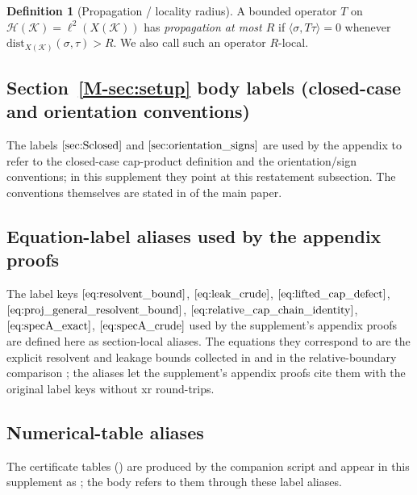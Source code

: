 \documentclass[11pt]{article}
\numberwithin{equation}{section}
\theoremstyle{definition}
\newtheorem{definition}[theorem]{Definition}
\theoremstyle{remark}
\newcommand{\K}{\mathcal{K}}
\newcommand{\Hil}{\mathcal{H}}
\newcommand{\dist}{\mathrm{dist}}
\begin{document}
\begin{definition}[Propagation / locality radius]\label{def:propagation}
A bounded operator $T$ on $\Hil(\K)=\ell^2(X(\K))$ has \emph{propagation at most $R$} if
$\langle \sigma,T\tau\rangle=0$ whenever $\dist_{X(\K)}(\sigma,\tau)>R$. We also call such an
operator $R$-local.
\end{definition}

\subsection*{Section~\protect\ref{M-sec:setup} body labels (closed-case and orientation conventions)}\label{sec:Sclosed}\label{sec:orientation_signs}

The labels \(\ref{sec:Sclosed}\) and \(\ref{sec:orientation_signs}\) are used by the appendix to
refer to the closed-case cap-product definition and the orientation/sign conventions; in this
supplement they point at this restatement subsection. The conventions themselves are stated in
 of the main paper.

\subsection*{Equation-label aliases used by the appendix proofs}
\label{eq:resolvent_bound}%
\label{eq:leak_crude}%
\label{eq:lifted_cap_defect}%
\label{eq:proj_general_resolvent_bound}%
\label{eq:relative_cap_chain_identity}%
\label{eq:specA_exact}%
\label{eq:specA_crude}%

The label keys
\(\ref{eq:resolvent_bound}\), \(\ref{eq:leak_crude}\), \(\ref{eq:lifted_cap_defect}\),
\(\ref{eq:proj_general_resolvent_bound}\), \(\ref{eq:relative_cap_chain_identity}\),
\(\ref{eq:specA_exact}\), \(\ref{eq:specA_crude}\) used by the supplement's appendix proofs are
defined here as section-local aliases. The equations they correspond to are the explicit
resolvent and leakage bounds collected in  and in the
relative-boundary comparison ; the aliases let the
supplement's appendix proofs cite them with the original label keys without xr round-trips.

\subsection*{Numerical-table aliases}

The certificate tables ()
are produced by the companion script and appear in this supplement as
; the body refers to them through these label aliases.
\end{document}
